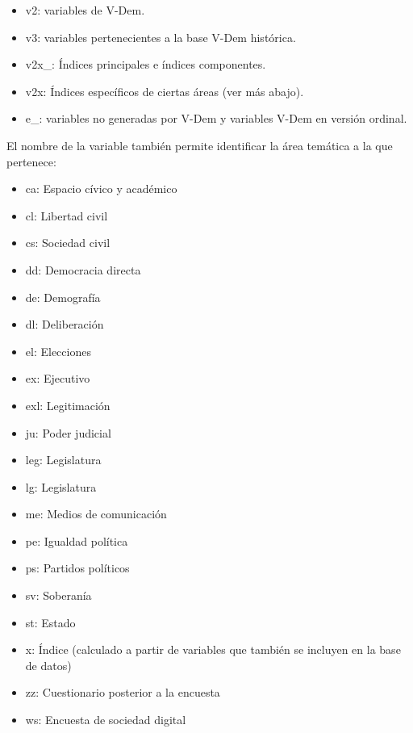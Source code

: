 \documentclass{article}
\begin{document}
\begin{itemize}
  \item v2: variables de V-Dem.
  \item v3: variables pertenecientes a la base V-Dem histórica.
  \item v2x\_: Índices principales e índices componentes.
  \item v2x: Índices específicos de ciertas 
  áreas (ver más abajo).
  \item e\_: variables no generadas por V-Dem y variables V-Dem en versión ordinal.
\end{itemize}

El nombre de la variable también permite identificar la área temática a la que 
pertenece:

\begin{itemize}
  \item ca: Espacio cívico y académico
  \item cl: Libertad civil
  \item cs: Sociedad civil
  \item dd: Democracia directa
  \item de: Demografía
  \item dl: Deliberación
  \item el: Elecciones
  \item ex: Ejecutivo
  \item exl: Legitimación
  \item ju: Poder judicial
  \item leg: Legislatura
  \item lg: Legislatura
  \item me: Medios de comunicación
  \item pe: Igualdad política
  \item ps: Partidos políticos
  \item sv: Soberanía
  \item st: Estado
  \item x: Índice (calculado a partir de variables que también se 
  incluyen en la base de datos)
  \item zz: Cuestionario posterior a la encuesta
  \item ws: Encuesta de sociedad digital
\end{itemize}
\end{document}
